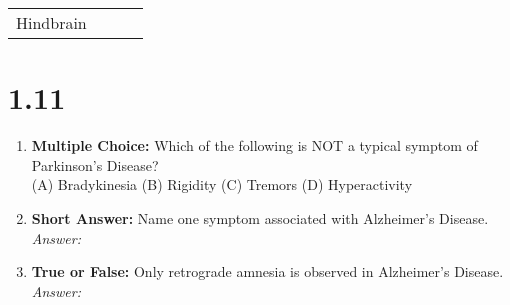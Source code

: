 \begin{table}[ht]
\begin{tabular}{l l l l}
            \multirow{4}{*}{Hindbrain}
                                     & \multirow{4}{*}{\underline{\hspace{3cm}}}
                                     & \multirow{2}{*}{\underline{\hspace{3cm}}}
                                     & \underline{\hspace{3cm}}                                                                                        \\
                                     &                                                          &
                                     & \underline{\hspace{3cm}}                                                                                               \\[0.5em]
            \cline{3-4}                                                                                                                                         \\[-0.5em]
                                     &                                                          & \underline{\hspace{3cm}}
                                     & \underline{\hspace{3cm}}                                                                                 \\
            \bottomrule
      \end{tabular}
      \label{tab:brain-divisions}
\end{table}

\section*{1.11 \squigglyline}
\begin{enumerate}[label=\textbf{Q1.11.\arabic*}]
      \item \textbf{Multiple Choice:} Which of the following is NOT a typical symptom of Parkinson's Disease? \\
            (A) Bradykinesia \quad (B) Rigidity \quad (C) Tremors \quad (D) Hyperactivity

      \item \textbf{Short Answer:} Name one symptom associated with Alzheimer's Disease. \\
            \textit{Answer:} %

      \item \textbf{True or False:} Only retrograde amnesia is observed in Alzheimer's Disease. \\
            \textit{Answer:} %
\end{enumerate}
